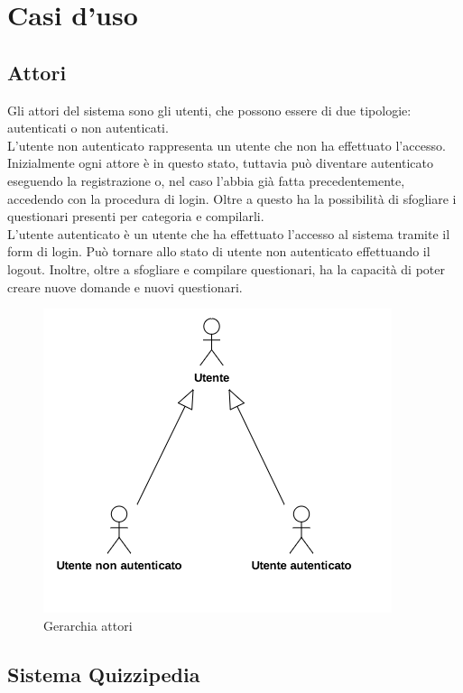 \documentclass[a4paper,11pt]{article}
\begin{document}
	\newpage
	\section{Casi d'uso}
\subsection{Attori}
Gli attori del sistema sono gli utenti, che possono essere di due tipologie: autenticati o non autenticati.\\ 
L'utente non autenticato rappresenta un utente che non ha effettuato l'accesso. Inizialmente ogni attore è in questo stato, tuttavia può diventare autenticato eseguendo la registrazione o, nel caso l'abbia già fatta precedentemente, accedendo con la procedura di login. Oltre a questo ha la possibilità di  sfogliare i questionari presenti per categoria e compilarli.\\
L'utente autenticato è un utente che ha effettuato l'accesso al sistema tramite il form di login. Può tornare allo stato di utente non autenticato effettuando il logout. Inoltre, oltre a sfogliare e compilare questionari, ha la capacità di poter creare nuove domande e nuovi questionari.\\

\begin{figure}[h!]
\centering
\includegraphics[scale=1]{../immagini/Actors.png}
\caption{Gerarchia attori}
\end{figure}

\newpage
\subsection{Sistema Quizzipedia}
\end{document}
